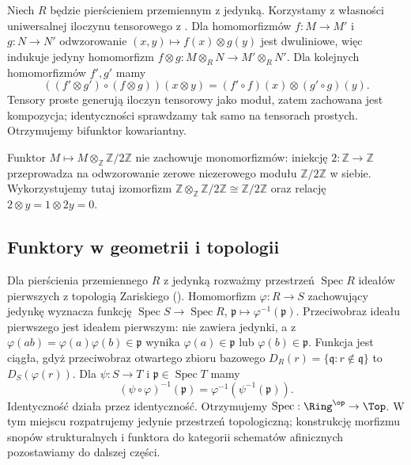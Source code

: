 \begin{przyklad}\label{cat:ex:tensor-bifunctor}
Niech $R$ będzie pierścieniem przemiennym z jedynką. Korzystamy z własności uniwersalnej iloczynu tensorowego z . Dla homomorfizmów $f:M\to M'$ i $g:N\to N'$ odwzorowanie $(x,y)\mapsto f(x)\otimes g(y)$ jest dwuliniowe, więc indukuje jedyny homomorfizm $f\otimes g:M\otimes_R N\to M'\otimes_R N'$. Dla kolejnych homomorfizmów $f',g'$ mamy
\[
((f'\otimes g')\circ(f\otimes g))(x\otimes y)
=(f'\circ f)(x)\otimes(g'\circ g)(y).
\]
Tensory proste generują iloczyn tensorowy jako moduł, zatem zachowana jest kompozycja; identyczności sprawdzamy tak samo na tensorach prostych. Otrzymujemy bifunktor kowariantny.

Funktor $M\mapsto M\otimes_{\mathbb Z}\mathbb Z/2\mathbb Z$ nie zachowuje monomorfizmów: iniekcję $2:\mathbb Z\to\mathbb Z$ przeprowadza na odwzorowanie zerowe niezerowego modułu $\mathbb Z/2\mathbb Z$ w siebie. Wykorzystujemy tutaj izomorfizm $\mathbb Z\otimes_{\mathbb Z}\mathbb Z/2\mathbb Z\cong\mathbb Z/2\mathbb Z$ oraz relację $2\otimes y=1\otimes 2y=0$.
\end{przyklad}

\subsection{Funktory w geometrii i topologii}

\begin{przyklad}\label{cat:ex:spec-functor}
Dla pierścienia przemiennego $R$ z jedynką rozważmy przestrzeń $\operatorname{Spec} R$ ideałów pierwszych z topologią Zariskiego (). Homomorfizm $\varphi:R\to S$ zachowujący jedynkę wyznacza funkcję $\operatorname{Spec} S\to\operatorname{Spec} R$, $\mathfrak p\mapsto\varphi^{-1}(\mathfrak p)$. Przeciwobraz ideału pierwszego jest ideałem pierwszym: nie zawiera jedynki, a z $\varphi(ab)=\varphi(a)\varphi(b)\in\mathfrak p$ wynika $\varphi(a)\in\mathfrak p$ lub $\varphi(b)\in\mathfrak p$. Funkcja jest ciągła, gdyż przeciwobraz otwartego zbioru bazowego $D_R(r)=\{\mathfrak q:r\notin\mathfrak q\}$ to $D_S(\varphi(r))$. Dla $\psi:S\to T$ i $\mathfrak p\in\operatorname{Spec} T$ mamy
\[
(\psi\circ\varphi)^{-1}(\mathfrak p)=\varphi^{-1}(\psi^{-1}(\mathfrak p)).
\]
Identyczność działa przez identyczność. Otrzymujemy $\operatorname{Spec}:\Ring^{\op}\to\Top$. W tym miejscu rozpatrujemy jedynie przestrzeń topologiczną; konstrukcję morfizmu snopów strukturalnych i funktora do kategorii schematów afinicznych pozostawiamy do dalszej części.
\end{przyklad}

